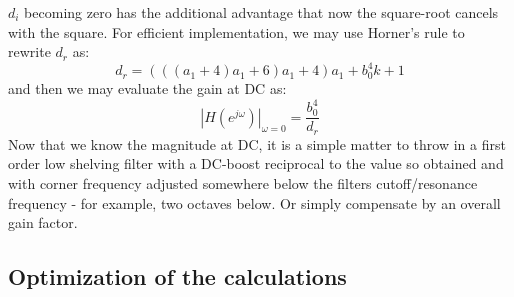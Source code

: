 $d_i$ becoming zero has the additional advantage that now the square-root cancels with the square. For efficient implementation, we may use Horner's rule to rewrite $d_r$ as:
\begin{equation}
\boxed
{
 d_r = (((a_1 + 4)a_1 + 6)a_1 + 4)a_1 + b_0^4 k + 1 
}
\end{equation}
and then we may evaluate the gain at DC as:
\begin{equation}
\boxed
{
 \left|H(e^{j \omega}) \right|_{\omega=0} = \frac{b_0^4}{d_r} 
}
\end{equation}
Now that we know the magnitude at DC, it is a simple matter to throw in a first order low shelving filter with a DC-boost reciprocal to the value so obtained and with corner frequency adjusted somewhere below the filters cutoff/resonance frequency - for example, two octaves below. Or simply compensate by an overall gain factor.

\subsection{Optimization of the calculations}

